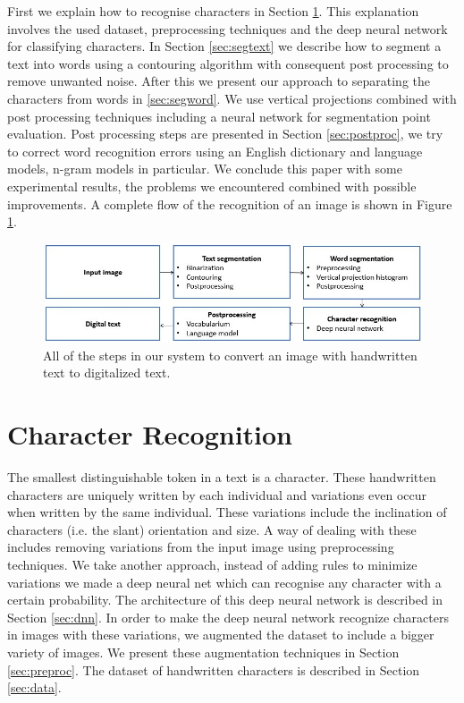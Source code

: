 \documentclass{article}
\begin{document}
First we explain how to recognise characters in Section \ref{sec:charrec}. This explanation involves the used dataset, preprocessing techniques and the deep neural network for classifying characters.
In Section \ref{sec:segtext} we describe how to segment a text into words using a contouring algorithm with consequent post processing to remove unwanted noise.
After this we present our approach to separating the characters from words in \ref{sec:segword}. We use vertical projections combined with post processing techniques including a neural network for segmentation point evaluation.
Post processing steps are presented in Section \ref{sec:postproc}, we try to correct word recognition errors using an English dictionary and language models, n-gram models in particular.
We conclude this paper with some experimental results, the problems we encountered combined with possible improvements. A complete flow of the recognition of an image is shown in Figure \ref{fig:flow}.

\begin{figure}
  \centering
  \includegraphics[width=\linewidth]{images/flow_hor}
  \caption{All of the steps in our system to convert an image with handwritten text to digitalized text.}
  \label{fig:flow}
\end{figure}

\section{Character Recognition}
\label{sec:charrec}
The smallest distinguishable token in a text is a character. These handwritten characters are uniquely
written by each individual and variations even occur when written by the same individual. These variations include the inclination of characters (i.e. the slant) orientation and size.
A way of dealing with these includes removing variations from the input image using preprocessing techniques.
We take another approach, instead of adding rules to minimize variations we made a deep neural net which can recognise any character with a certain probability. The architecture of this deep neural network is described in Section \ref{sec:dnn}.
In order to make the deep neural network recognize characters in images with these variations, we augmented the dataset to include a bigger variety of images. We present these augmentation techniques in Section \ref{sec:preproc}.
The dataset of handwritten characters is described in Section \ref{sec:data}.
\end{document}
